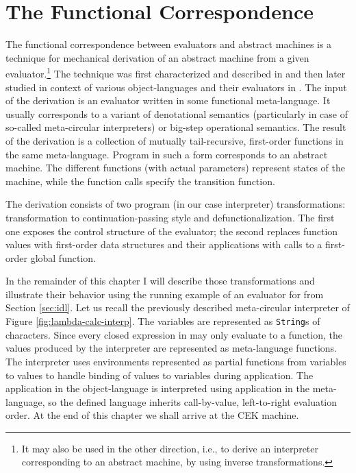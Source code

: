 \chapter{The Functional Correspondence}\label{chapter:functional-correspondence}
The functional correspondence between evaluators and abstract machines is a technique for mechanical derivation of an abstract machine from a given evaluator.\footnote{It may also be used in the other direction, i.e., to derive an interpreter corresponding to an abstract machine, by using inverse transformations.}
The technique was first characterized and described in \cite{functional-correspondence} and then later studied in context of various object-languages and their evaluators in \cite{ager-interpreter-compiler,ager-call-by-need,pirog-stg,biernacki-logic-engine,biernacka-delimited-continuations,ager-monadic-evaluators,danvy-object-oriented,jedynak-ltac}.
The input of the derivation is an evaluator written in some functional meta-language.
It usually corresponds to a variant of denotational semantics (particularly in case of so-called meta-circular interpreters) or big-step operational semantics.
The result of the derivation is a collection of mutually tail-recursive, first-order functions in the same meta-language.
Program in such a form corresponds to an abstract machine.
The different functions (with actual parameters) represent states of the machine, while the function calls specify the transition function.

The derivation consists of two program (in our case interpreter) transformations: transformation to continuation-passing style and defunctionalization.
The first one exposes the control structure of the evaluator; the second replaces function values with first-order data structures and their applications with calls to a first-order global function.

In the remainder of this chapter I will describe those transformations and illustrate their behavior using the running example of an evaluator for \LC{} from Section \ref{sec:idl}.
Let us recall the previously described meta-circular interpreter of Figure \ref{fig:lambda-calc-interp}.
The variables are represented as \lstinline!String!s of characters.
Since every closed expression in \LC{} may only evaluate to a function, the values produced by the interpreter are represented as meta-language functions.
The interpreter uses environments represented as partial functions from variables to values to handle binding of values to variables during application.
The application in the object-language is interpreted using application in the meta-language, so the defined language inherits call-by-value, left-to-right evaluation order.
At the end of this chapter we shall arrive at the CEK machine.

